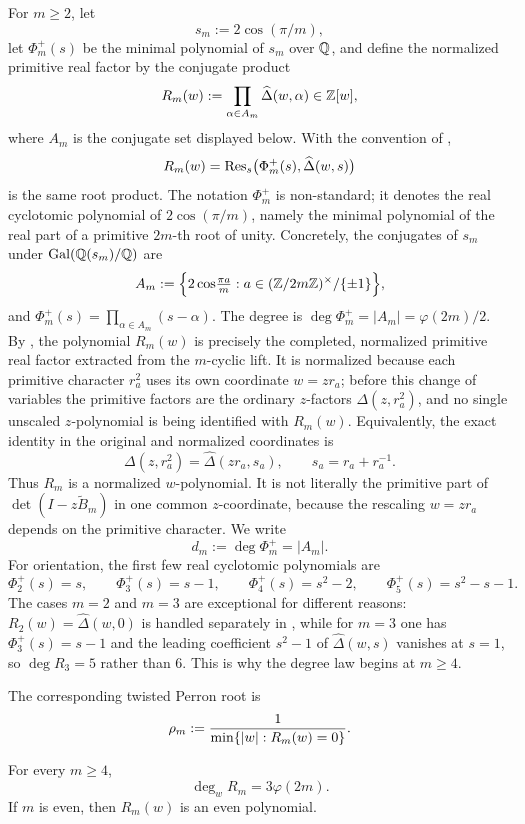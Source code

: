 For \(m\ge 2\), let
\[
  s_m:=2\cos(\pi/m),
\]
let \(\Phi_m^+(s)\) be the minimal polynomial of \(s_m\) over \(\mathbb{Q}\), and
define the normalized primitive real factor by the conjugate product
\[
  R_m(w):=\prod_{\alpha\in A_m}\widehat\Delta(w,\alpha)\in\mathbb{Z}[w],
\]
where \(A_m\) is the conjugate set displayed below. With the convention
of ,
\[
  R_m(w)=\operatorname{Res}_s\bigl(\Phi_m^+(s),\widehat\Delta(w,s)\bigr)
\]
is the same root product.
The notation \(\Phi_m^+\) is non-standard; it denotes the real
cyclotomic polynomial of \(2\cos(\pi/m)\), namely the minimal
polynomial of the real part of a primitive \(2m\)-th root of unity.
Concretely, the conjugates of \(s_m\) under \(\operatorname{Gal}(\mathbb{Q}(s_m)/\mathbb{Q})\) are
\[
  A_m:=\Bigl\{2\cos\!\tfrac{\pi a}{m}:a\in(\mathbb{Z}/2m\mathbb{Z})^\times/\{\pm 1\}\Bigr\},
\]
and \(\Phi_m^+(s)=\prod_{\alpha\in A_m}(s-\alpha)\). The degree is
\(\deg\Phi_m^+=|A_m|=\varphi(2m)/2\). By
, the polynomial \(R_m(w)\) is
precisely the completed, normalized primitive real factor extracted from
the \(m\)-cyclic lift. It is normalized because each primitive character
\(r_a^2\) uses its own coordinate \(w=zr_a\); before this change of
variables the primitive factors are the ordinary \(z\)-factors
\(\Delta(z,r_a^2)\), and no single unscaled \(z\)-polynomial is being
identified with \(R_m(w)\). Equivalently, the exact identity in the
original and normalized coordinates is
\[
  \Delta(z,r_a^2)=\widehat\Delta(zr_a,s_a),
  \qquad s_a=r_a+r_a^{-1}.
\]
Thus \(R_m\) is a normalized \(w\)-polynomial. It is not literally the
primitive part of \(\det(I-z\widetilde B_m)\) in one common
\(z\)-coordinate, because the rescaling \(w=zr_a\) depends on the
primitive character. We write
\[
  d_m:=\deg\Phi_m^+=|A_m|.
\]
For orientation, the first few real cyclotomic polynomials are
\[
  \Phi_2^+(s)=s,\qquad
  \Phi_3^+(s)=s-1,\qquad
  \Phi_4^+(s)=s^2-2,\qquad
  \Phi_5^+(s)=s^2-s-1.
\]
The cases \(m=2\) and \(m=3\) are exceptional for different reasons:
\(R_2(w)=\widehat\Delta(w,0)\) is handled separately in
, while for \(m=3\) one has
\(\Phi_3^+(s)=s-1\) and the leading coefficient \(s^2-1\) of
\(\widehat\Delta(w,s)\) vanishes at \(s=1\), so \(\deg R_3=5\) rather
than \(6\). This is why the degree law begins at \(m\ge 4\).

The corresponding twisted Perron root is
\[
  \rho_m:=\frac{1}{\min\{\lvert w \rvert:R_m(w)=0\}}.
\]


\begin{theorem}
  \label{thm:sync-cyclotomic-degree-law}
  For every \(m\ge 4\),
  \[
    \deg_w R_m=3\varphi(2m).
  \]
  If \(m\) is even, then \(R_m(w)\) is an even polynomial.
\end{theorem}

